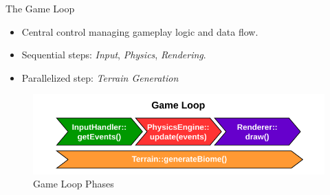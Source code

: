 \begin{frame}{The Game Loop}
    \begin{itemize}
        \item Central control managing gameplay logic and data flow.
        \item Sequential steps: \textit{Input}, \textit{Physics}, \textit{Rendering}.
        \item Parallelized step: \textit{Terrain Generation} 
    \end{itemize}
    \begin{figure}
        \centering
        \includegraphics[width=0.8\linewidth]{../figures/physics/gameLoop.pdf}
        \caption{Game Loop Phases}
    \end{figure}
\end{frame}